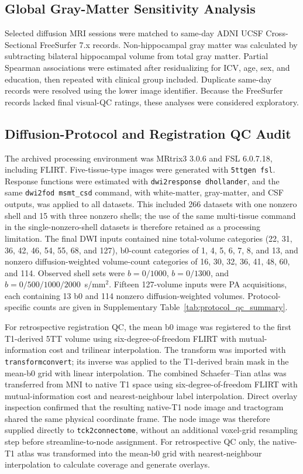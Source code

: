 \documentclass{article}
\providecommand{\DIFaddtex}[1]{{\protect\color{blue}#1}} %
\providecommand{\DIFaddbegin}{} %
\providecommand{\DIFaddend}{} %
\providecommand{\DIFadd}[1]{\texorpdfstring{\DIFaddtex{#1}}{#1}} %
\begin{document}
\endgroup
\DIFaddend \subsection{Global Gray-Matter Sensitivity Analysis}
Selected diffusion MRI sessions were matched to same-day ADNI UCSF Cross-Sectional FreeSurfer 7.x records. Non-hippocampal gray matter was calculated by subtracting bilateral hippocampal volume from total gray matter. Partial Spearman associations were estimated after residualizing for ICV, age, sex, and education, then repeated with clinical group included. Duplicate same-day records were resolved using the lower image identifier. Because the FreeSurfer records lacked final visual-QC ratings, these analyses were considered exploratory.

\DIFaddbegin \subsection{\DIFadd{Diffusion-Protocol and Registration QC Audit}}
\begin{sloppypar}
\DIFadd{The archived processing environment was MRtrix3 3.0.6 and FSL 6.0.7.18, including FLIRT. Five-tissue-type images were generated with \texttt{5ttgen fsl}. Response functions were estimated with \texttt{dwi2response dhollander}, and the same \texttt{dwi2fod msmt\_csd} command, with white-matter, gray-matter, and CSF outputs, was applied to all datasets. This included 266 datasets with one nonzero shell and 15 with three nonzero shells; the use of the same multi-tissue command in the single-nonzero-shell datasets is therefore retained as a processing limitation. The final DWI inputs contained nine total-volume categories (22, 31, 36, 42, 46, 54, 55, 68, and 127), b0-count categories of 1, 4, 5, 6, 7, 8, and 13, and nonzero diffusion-weighted volume-count categories of 16, 30, 32, 36, 41, 48, 60, and 114. Observed shell sets were $b=0/1000$, $b=0/1300$, and $b=0/500/1000/2000$~s/mm$^{2}$. Fifteen 127-volume inputs were PA acquisitions, each containing 13 b0 and 114 nonzero diffusion-weighted volumes. Protocol-specific counts are given in Supplementary Table~\ref{tab:protocol_qc_summary}.
}\end{sloppypar}

\DIFadd{For retrospective registration QC, the mean b0 image was registered to the first T1-derived 5TT volume using six-degree-of-freedom FLIRT with mutual-information cost and trilinear interpolation. The transform was imported with \texttt{transformconvert}; its inverse was applied to the T1-derived brain mask in the mean-b0 grid with linear interpolation. The combined Schaefer--Tian atlas was transferred from MNI to native T1 space using six-degree-of-freedom FLIRT with mutual-information cost and nearest-neighbour label interpolation. Direct overlay inspection confirmed that the resulting native-T1 node image and tractogram shared the same physical coordinate frame. The node image was therefore supplied directly to \texttt{tck2connectome}, without an additional voxel-grid resampling step before streamline-to-node assignment. For retrospective QC only, the native-T1 atlas was transformed into the mean-b0 grid with nearest-neighbour interpolation to calculate coverage and generate overlays.
}
\end{document}
